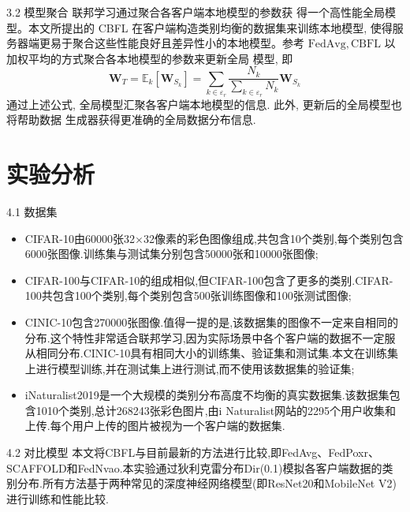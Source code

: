 \documentclass{sintefbeamer}
\theoremstyle{definition}
\begin{document}
\begin{frame}{3.2 模型聚合}
联邦学习通过聚合各客户端本地模型的参数获 得一个高性能全局模型。本文所提出的 CBFL 在客户端构造类别均衡的数据集来训练本地模型, 使得服务器端更易于聚合这些性能良好且差异性小的本地模型。参考 $\mathrm{FedAvg}, \mathrm{CBFL}$ 以 加权平均的方式聚合各本地模型的参数来更新全局 模型, 即
$$
\boldsymbol{W}_T=\mathbb{E}_k\left[\boldsymbol{W}_{S_k}\right]=\sum_{k \in \varepsilon_r} \frac{N_k}{\sum_{k \in \varepsilon_r} N_k} \boldsymbol{W}_{S_k} 
$$
通过上述公式, 全局模型汇聚各客户端本地模型的信息. 此外, 更新后的全局模型也将帮助数据 生成器获得更准确的全局数据分布信息.

\end{frame}




\section{实验分析}

\begin{frame}{4.1 数据集}

	\begin{itemize}
\item[1)] CIFAR-10由60000张32×32像素的彩色图像组成,共包含10个类别,每个类别包含6000张图像.训练集与测试集分别包含50000张和10000张图像; 
\item[2)] CIFAR-100与CIFAR-10的组成相似,但CIFAR-100包含了更多的类别.CIFAR-100共包含100个类别,每个类别包含500张训练图像和100张测试图像; 
\item[3)] CINIC-10包含270000张图像.值得一提的是,该数据集的图像不一定来自相同的分布.这个特性非常适合联邦学习,因为实际场景中各个客户端的数据不一定服从相同分布.CINIC-10具有相同大小的训练集、验证集和测试集.本文在训练集上进行模型训练,并在测试集上进行测试,而不使用该数据集的验证集; 
\item[4)] iNaturalist2019是一个大规模的类别分布高度不均衡的真实数据集.该数据集包含1010个类别,总计268243张彩色图片,由i Naturalist网站的2295个用户收集和上传.每个用户上传的图片被视为一个客户端的数据集.
\end{itemize}
\end{frame}

\begin{frame}{4.2 对比模型}
	本文将CBFL与目前最新的方法进行比较,即FedAvg、FedPoxr、SCAFFOLD和FedNvao.本实验通过狄利克雷分布Dir(0.1)模拟各客户端数据的类别分布.所有方法基于两种常见的深度神经网络模型(即ResNet20和MobileNet V2)进行训练和性能比较.
\end{frame}
\end{document}
